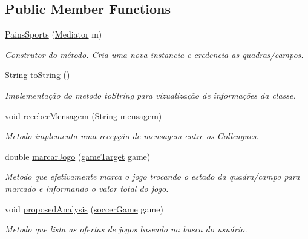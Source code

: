 \subsection*{Public Member Functions}
\begin{DoxyCompactItemize}
\item 
\mbox{\hyperlink{classmediator_pattern_1_1_pains_sports_a9e051d10b0ceb4ee753d584499c65515}{Pains\+Sports}} (\mbox{\hyperlink{interfacemediator_pattern_1_1_mediator}{Mediator}} m)
\begin{DoxyCompactList}\small\item\em Construtor do método. Cria uma nova instancia e credencia as quadras/campos. \end{DoxyCompactList}\item 
String \mbox{\hyperlink{classmediator_pattern_1_1_pains_sports_a3998f833fa659afc000dc7ae4cafb561}{to\+String}} ()
\begin{DoxyCompactList}\small\item\em Implementação do metodo to\+String para vizualização de informações da classe. \end{DoxyCompactList}\item 
void \mbox{\hyperlink{classmediator_pattern_1_1_pains_sports_a4b71c6055d71d057663b29fb7be13e64}{receber\+Mensagem}} (String mensagem)
\begin{DoxyCompactList}\small\item\em Metodo implementa uma recepção de mensagem entre os Colleagues. \end{DoxyCompactList}\item 
double \mbox{\hyperlink{classmediator_pattern_1_1_pains_sports_aa43286614d384ce79cf667420f37ab7c}{marcar\+Jogo}} (\mbox{\hyperlink{interfaceadapter_pattern_1_1game_target}{game\+Target}} game)
\begin{DoxyCompactList}\small\item\em Metodo que efetivamente marca o jogo trocando o estado da quadra/campo para marcado e informando o valor total do jogo. \end{DoxyCompactList}\item 
void \mbox{\hyperlink{classmediator_pattern_1_1_pains_sports_ad969bb0f7382687dd921268ad4e391ab}{proposed\+Analysis}} (\mbox{\hyperlink{classtemplate_pattern_1_1soccer_game}{soccer\+Game}} game)
\begin{DoxyCompactList}\small\item\em Metodo que lista as ofertas de jogos baseado na busca do usuário. \end{DoxyCompactList}\end{DoxyCompactItemize}
